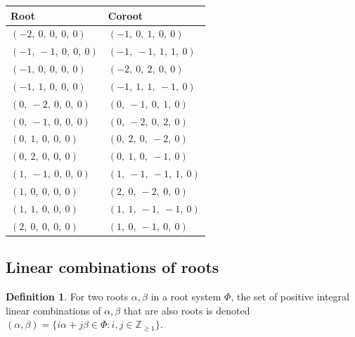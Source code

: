 \documentclass[11pt]{article}
\theoremstyle{definition}
\newtheorem{definition}{Definition}[section]
\begin{document}
\begin{tabular}{|l|l|}
    \hline
    \textbf{Root} & \textbf{Coroot} \\
    \hline
    $\left( -2, \  0, \  0, \  0, \  0\right)$ & $\left( -1, \  0, \  1, \  0, \  0\right)$ \\
    \hline
    $\left( -1, \  -1, \  0, \  0, \  0\right)$ & $\left( -1, \  -1, \  1, \  1, \  0\right)$ \\
    \hline
    $\left( -1, \  0, \  0, \  0, \  0\right)$ & $\left( -2, \  0, \  2, \  0, \  0\right)$ \\
    \hline
    $\left( -1, \  1, \  0, \  0, \  0\right)$ & $\left( -1, \  1, \  1, \  -1, \  0\right)$ \\
    \hline
    $\left( 0, \  -2, \  0, \  0, \  0\right)$ & $\left( 0, \  -1, \  0, \  1, \  0\right)$ \\
    \hline
    $\left( 0, \  -1, \  0, \  0, \  0\right)$ & $\left( 0, \  -2, \  0, \  2, \  0\right)$ \\
    \hline
    $\left( 0, \  1, \  0, \  0, \  0\right)$ & $\left( 0, \  2, \  0, \  -2, \  0\right)$ \\
    \hline
    $\left( 0, \  2, \  0, \  0, \  0\right)$ & $\left( 0, \  1, \  0, \  -1, \  0\right)$ \\
    \hline
    $\left( 1, \  -1, \  0, \  0, \  0\right)$ & $\left( 1, \  -1, \  -1, \  1, \  0\right)$ \\
    \hline
    $\left( 1, \  0, \  0, \  0, \  0\right)$ & $\left( 2, \  0, \  -2, \  0, \  0\right)$ \\
    \hline
    $\left( 1, \  1, \  0, \  0, \  0\right)$ & $\left( 1, \  1, \  -1, \  -1, \  0\right)$ \\
    \hline
    $\left( 2, \  0, \  0, \  0, \  0\right)$ & $\left( 1, \  0, \  -1, \  0, \  0\right)$ \\
    \hline
\end{tabular}


\subsection{Linear combinations of roots}

\begin{definition}
For two roots $\alpha, \beta$ in a root system $\Phi$, the set of positive integral linear combinations of $\alpha, \beta$ that are also roots is denoted
\(
	(\alpha, \beta) = \{ i \alpha + j \beta \in \Phi : i, j \in \mathbb{Z}_{\ge 1} \}
\).
\end{definition}
\end{document}
